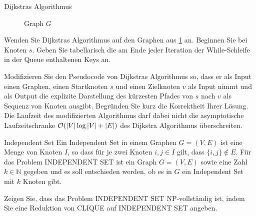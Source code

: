 \documentclass{exercisesheet}
\begin{document}
\begin{eexercises}{Dijkstras Algorithmus}{
    \begin{figure}[ht]
      \centering


      \caption{Graph $G$}\label{fig:dijkstra}
    \end{figure}
  }
  \item Wenden Sie Dijkstras Algorithmus auf den Graphen aus \ref{fig:dijkstra} an. Beginnen Sie bei Knoten $s$. Geben Sie tabellarisch die am Ende jeder Iteration der While-Schleife in der Queue enthaltenen Keys an.
  \item Modifizieren Sie den Pseudocode von Dijkstras Algorithmus so, dass er als Input einen Graphen, einen Startknoten $s$ und einen Zielknoten $v$ als Input nimmt und als Output die explizite Darstellung des kürzesten Pfades von $s$ nach $v$ als Sequenz von Knoten ausgibt. Begründen Sie kurz die Korrektheit Ihrer Lösung. Die Laufzeit des modifizierten Algorithmus darf dabei nicht die asymptotische Laufzeitschranke $\mathcal{O}(|V| \log |V| + |E|)$ des Dijkstra Algorithmus überschreiten.
\end{eexercises}



\begin{exercise}{Independent Set}
  Ein Independent Set in einem Graphen $G = (V, E)$ ist eine Menge von Knoten $I$, so dass für je zwei Knoten $i, j \in I$ gilt, dass $\{i, j\} \notin E$. Für das Problem INDEPENDENT SET ist ein Graph $G = (V, E)$ sowie eine Zahl $k \in \mathbb{N}$ gegeben und es soll entschieden werden, ob es in $G$ ein Independent Set mit $k$ Knoten gibt.\par
  Zeigen Sie, dass das Problem INDEPENDENT SET NP-vollständig ist, indem Sie eine Reduktion von CLIQUE auf INDEPENDENT SET angeben.
\end{exercise}
\end{document}
